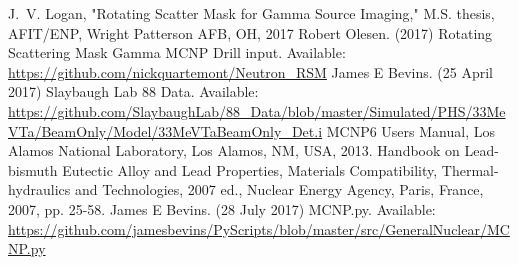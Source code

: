 \documentclass[journal]{IEEEtran}
\begin{document}
	\begin{thebibliography}{6}
		J.~V. Logan, "Rotating Scatter Mask for Gamma Source Imaging," M.S. thesis, AFIT/ENP, Wright Patterson AFB, OH, 2017
		Robert Olesen. (2017) Rotating Scattering Mask Gamma MCNP Drill input. Available:
		\url{https://github.com/nickquartemont/Neutron_RSM} 
		James E Bevins. (25 April 2017) Slaybaugh Lab 88 Data. Available: \url{https://github.com/SlaybaughLab/88_Data/blob/master/Simulated/PHS/33MeVTa/BeamOnly/Model/33MeVTaBeamOnly_Det.i}
		MCNP6 Users Manual, Los Alamos National Laboratory, Los Alamos, NM, USA, 2013.
		Handbook on Lead-bismuth Eutectic Alloy and Lead Properties, Materials Compatibility, Thermal-hydraulics and Technologies, 2007 ed., Nuclear Energy Agency, Paris, France, 2007, pp. 25-58.
		James E Bevins. (28 July 2017) MCNP.py. Available:
		\url{https://github.com/jamesbevins/PyScripts/blob/master/src/GeneralNuclear/MCNP.py}
	\end{thebibliography}
	
\end{document}
